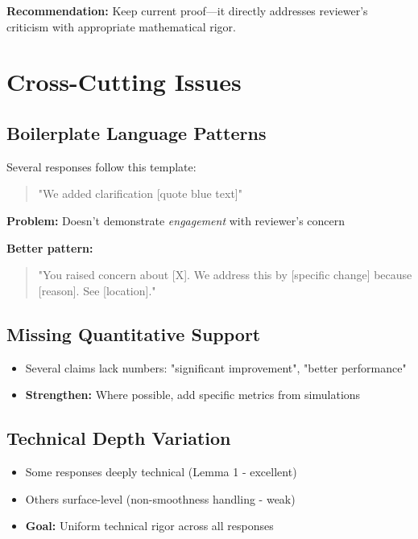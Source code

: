\documentclass[11pt]{article}
\begin{document}
\textbf{Recommendation:} Keep current proof—it directly addresses reviewer's criticism with appropriate mathematical rigor.

\section{Cross-Cutting Issues}

\subsection{Boilerplate Language Patterns}

Several responses follow this template:
\begin{quote}
"We added clarification [quote blue text]"
\end{quote}

\textbf{Problem:} Doesn't demonstrate \textit{engagement} with reviewer's concern

\textbf{Better pattern:}
\begin{quote}
"You raised concern about [X]. We address this by [specific change] because [reason]. See [location]."
\end{quote}

\subsection{Missing Quantitative Support}

\begin{itemize}
\item Several claims lack numbers: "significant improvement", "better performance"
\item \textbf{Strengthen:} Where possible, add specific metrics from simulations
\end{itemize}

\subsection{Technical Depth Variation}

\begin{itemize}
\item Some responses deeply technical (Lemma 1 - excellent)
\item Others surface-level (non-smoothness handling - weak)
\item \textbf{Goal:} Uniform technical rigor across all responses
\end{itemize}
\end{document}
